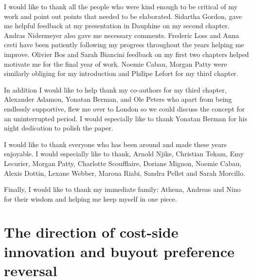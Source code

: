 \documentclass[12pt,twoside]{report}
\makeatletter
\numberwithin{equation}{section}
\newcommand{\chapterauthor}[1]{%
  {\parindent0pt\vspace*{-25pt}%
  \linespread{1.1}\large\scshape#1%
  \par\nobreak\vspace*{35pt}}
  \@afterheading%
}
\makeatother
\begin{document}
I would like to thank all the people who were kind enough to be critical of my work and point out points that needed to be elaborated. Sidartha Gordon, gave me helpful feedback at my presentation in Dauphine on my second chapter. Andras Nidermeyer also gave me necessary comments. Frederic Loss and Anna creti have been patiently following my progress throughout the years helping me improve. Olivier Bos and Sarah Biancini feedback on my first two chapters helped motivate me for the final year of work. Noemie Cabau, Morgan Patty were similarly obliging for my introduction and Philipe Lefort for my third chapter. 

In addition I would like to help thank my co-authors for my third chapter, Alexander Adamou, Yonatan Berman, and Ole Peters who apart from being endlessly supportive, flew me over to London so we could discuss the concept for an uninterrupted period. I would especially like to thank Yonatan Berman for his night dedication to polish the paper.

I would like to thank everyone who has been around and made these years enjoyable. I would especially like to thank, Arnold Njike, Christian Tekam, Emy Lecurier, Morgan Patty, Charlotte Scoufflaire, Doriane Mignon, Noemie Cabau, Alexis Dottin, Lexane Webber, Maroua Riabi, Sandra Pellet and Sarah Morcillo. 

Finally, I would like to thank my immediate family: Athena, Andreas and Nino for their wisdom and helping me keep myself in one piece.
% 
%
% 

\chapter{The direction of cost-side innovation and buyout preference reversal}

\end{document}
